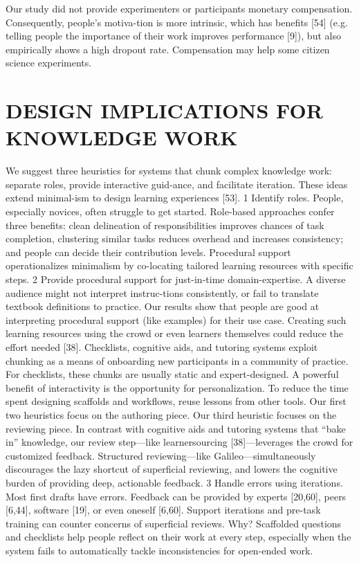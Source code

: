 Our study did not provide experimenters or participants monetary compensation. Consequently, people’s motiva-tion is more intrinsic, which has benefits [54] (e.g. telling people the importance of their work improves performance [9]), but also empirically shows a high dropout rate. Compensation may help some citizen science experiments. 

\section{DESIGN IMPLICATIONS FOR KNOWLEDGE WORK}
We suggest three heuristics for systems that chunk complex knowledge work: separate roles, provide interactive guid-ance, and facilitate iteration. These ideas extend minimal-ism to design learning experiences [53]. 
1 Identify roles. People, especially novices, often struggle to get started. Role-based approaches confer three benefits: clean delineation of responsibilities improves chances of task completion, clustering similar tasks reduces overhead and increases consistency; and people can decide their contribution levels. Procedural support operationalizes minimalism by co-locating tailored learning resources with specific steps.
2 Provide procedural support for just-in-time domain-expertise. A diverse audience might not interpret instruc-tions consistently, or fail to translate textbook definitions to practice. Our results show that people are good at interpreting procedural support (like examples) for their use case. Creating such learning resources using the crowd or even learners themselves could reduce the effort needed [38]. 
Checklists, cognitive aids, and tutoring systems exploit chunking as a means of onboarding new participants in a community of practice. For checklists, these chunks are usually static and expert-designed. A powerful benefit of interactivity is the opportunity for personalization. To reduce the time spent designing scaffolds and workflows, reuse lessons from other tools. 
 	Our first two heuristics focus on the authoring piece. Our third heuristic focuses on the reviewing piece. In contrast with cognitive aids and tutoring systems that “bake in” knowledge, our review step—like learnersourcing [38]—leverages the crowd for customized feedback. Structured reviewing—like Galileo—simultaneously discourages the lazy shortcut of superficial reviewing, and lowers the cognitive burden of providing deep, actionable feedback. 
3 Handle errors using iterations. Most first drafts have errors. Feedback can be provided by experts [20,60], peers [6,44], software [19], or even oneself [6,60]. Support iterations and pre-task training can counter concerns of superficial reviews. Why? Scaffolded questions and checklists help people reflect on their work at every step, especially when the system fails to automatically tackle inconsistencies for open-ended work.


